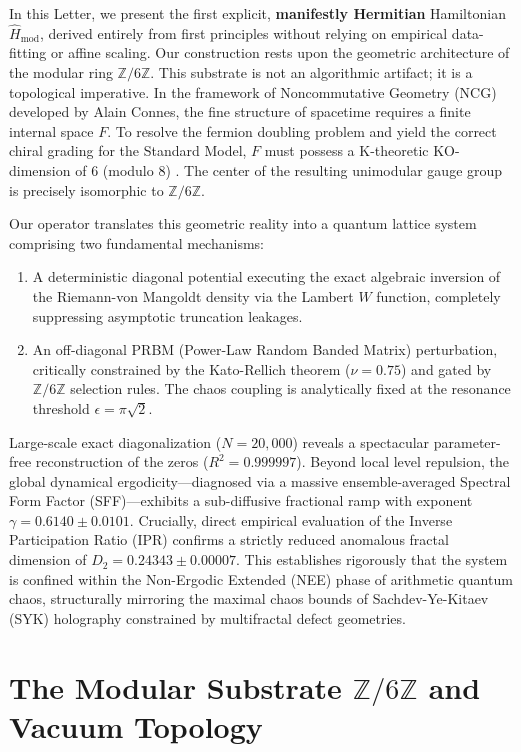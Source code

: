 \documentclass[aps,prl,preprint,superscriptaddress,floatfix]{revtex4-2}
\newcommand{\Zmod}{\mathbb{Z}/6\mathbb{Z}}
\begin{document}
In this Letter, we present the first explicit, \textbf{manifestly Hermitian} Hamiltonian $\hat{H}_{\text{mod}}$, derived entirely from first principles without relying on empirical data-fitting or affine scaling. Our construction rests upon the geometric architecture of the modular ring $\mathbb{Z}/6\mathbb{Z}$. This substrate is not an algorithmic artifact; it is a topological imperative. In the framework of Noncommutative Geometry (NCG) developed by Alain Connes, the fine structure of spacetime requires a finite internal space $F$. To resolve the fermion doubling problem and yield the correct chiral grading for the Standard Model, $F$ must possess a K-theoretic KO-dimension of 6 (modulo 8) \cite{Connes2008, Chamseddine2007, ConnesConsani2021}. The center of the resulting unimodular gauge group is precisely isomorphic to $\Zmod$.

Our operator translates this geometric reality into a quantum lattice system comprising two fundamental mechanisms:
\begin{enumerate}
    \item A deterministic diagonal potential executing the exact algebraic inversion of the Riemann-von Mangoldt density via the Lambert $W$ function, completely suppressing asymptotic truncation leakages.
    \item An off-diagonal PRBM (Power-Law Random Banded Matrix) perturbation, critically constrained by the Kato-Rellich theorem ($\nu = 0.75$) and gated by $\Zmod$ selection rules. The chaos coupling is analytically fixed at the resonance threshold $\epsilon = \pi\sqrt{2}$.
\end{enumerate}

Large-scale exact diagonalization ($N=20,000$) reveals a spectacular parameter-free reconstruction of the zeros ($R^2 = 0.999997$). Beyond local level repulsion, the global dynamical ergodicity—diagnosed via a massive ensemble-averaged Spectral Form Factor (SFF)—exhibits a sub-diffusive fractional ramp with exponent $\gamma = 0.6140 \pm 0.0101$. Crucially, direct empirical evaluation of the Inverse Participation Ratio (IPR) confirms a strictly reduced anomalous fractal dimension of $D_2 = 0.24343 \pm 0.00007$. This establishes rigorously that the system is confined within the Non-Ergodic Extended (NEE) phase of arithmetic quantum chaos, structurally mirroring the maximal chaos bounds of Sachdev-Ye-Kitaev (SYK) holography constrained by multifractal defect geometries.

\section{The Modular Substrate \texorpdfstring{$\mathbb{Z}/6\mathbb{Z}$}{Z/6Z} and Vacuum Topology}
\end{document}
